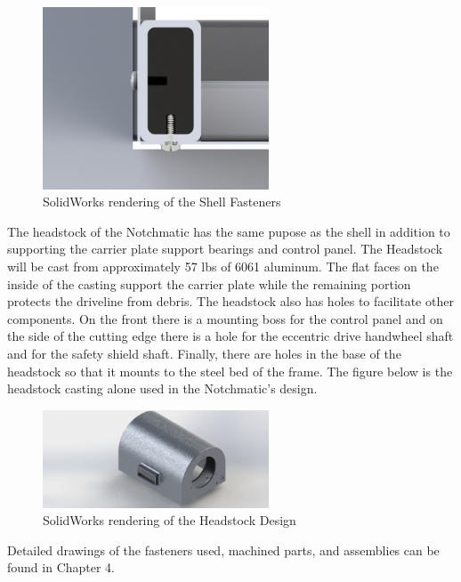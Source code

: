 \begin{figure}[H]
    \centering
    \includegraphics[width=0.6\textwidth]{./images/Chapter2-MachineDescription/ShellBolt}
    \caption{SolidWorks rendering of the Shell Fasteners}
    \label{fig:ShellBolts}
\end{figure}

\newpage
The headstock of the Notchmatic has the same pupose as the shell in addition to supporting the carrier plate support bearings and control panel. The Headstock will be cast from approximately 57 lbs of 6061 aluminum. The flat faces on the inside of the casting support the carrier plate while the remaining portion protects the driveline from debris. The headstock also has holes to facilitate other components. On the front there is  a mounting boss for the control panel and on the side of the cutting edge there is a hole for the eccentric drive handwheel shaft and for the safety shield shaft. Finally, there are holes in the base of the headstock so that it mounts to the steel bed of the frame. The figure below is the headstock casting alone used in the Notchmatic's design.

\begin{figure}[H]
    \centering
    \includegraphics[width=0.6\textwidth]{./images/Chapter2-MachineDescription/Headstock}
    \caption{SolidWorks rendering of the Headstock Design}
    \label{fig:Headstock}
\end{figure}

Detailed drawings of the fasteners used, machined parts, and assemblies can be found in Chapter 4.

